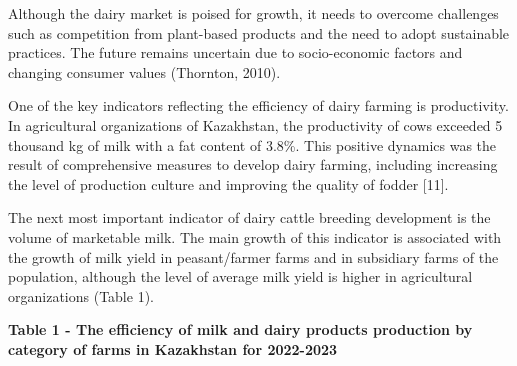 Although the dairy market is poised for growth, it needs to overcome
challenges such as competition from plant-based products and the need to
adopt sustainable practices. The future remains uncertain due to
socio-economic factors and changing consumer values (Thornton, 2010).

One of the key indicators reflecting the efficiency of dairy farming is
productivity. In agricultural organizations of Kazakhstan, the
productivity of cows exceeded 5 thousand kg of milk with a fat content
of 3.8\%. This positive dynamics was the result of comprehensive
measures to develop dairy farming, including increasing the level of
production culture and improving the quality of fodder {[}11{]}.

The next most important indicator of dairy cattle breeding development
is the volume of marketable milk. The main growth of this indicator is
associated with the growth of milk yield in peasant/farmer farms and in
subsidiary farms of the population, although the level of average milk
yield is higher in agricultural organizations (Table 1).

{\bfseries Table 1 - The efficiency of milk and dairy products production
by category of farms in Kazakhstan for 2022-2023}

